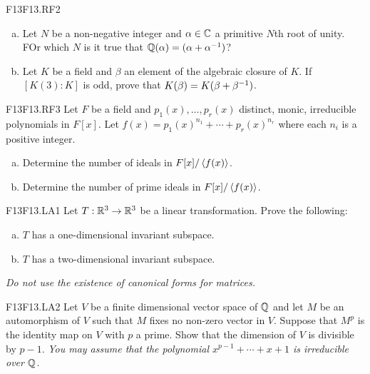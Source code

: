 \documentclass[../AlgebraQualSolutions.tex]{subfiles}
\begin{document}
\begin{prob}{F13}{F13.RF2}

	\begin{enumerate}[(a)]
		\item Let $N$ be a non-negative integer and $\alpha \in \mathbb{C}$ a primitive $N$th root of unity. FOr which $N$ is it true that $\mathbb{Q}(\alpha) = (\alpha + \alpha^{-1})$?
		\item Let $K$ be a field and $\beta$ an element of the algebraic closure of $K$. If $[K(3):K]$ is odd, prove that $K(\beta) = K(\beta + \beta^{-1})$.
	\end{enumerate}
\end{prob}

\begin{prob}{F13}{F13.RF3}
	Let $F$ be a field and $p_1(x), \ldots, p_r(x)$ distinct, monic, irreducible polynomials in $F[x]$. Let $f(x) = p_1(x)^{n_1} + \cdots + p_r(x)^{n_r}$ where each $n_i$ is a positive integer.

	\begin{enumerate}[(a)]
		\item Determine the number of ideals in $F[x]/\left\langle f(x) \right\rangle$.
		\item Determine the number of prime ideals in $F[x]/\left\langle f(x) \right\rangle$.
	\end{enumerate}
\end{prob}

\begin{prob}{F13}{F13.LA1}
	Let $T: \mathbb{R}^3 \to \mathbb{R}^3$ be a linear transformation. Prove the following:
	\begin{enumerate}[(a)]
		\item $T$ has a one-dimensional invariant subspace.
		\item $T$ has a two-dimensional invariant subspace.
	\end{enumerate}

	\emph{ Do not use the existence of canonical forms for matrices.}
\end{prob}

\begin{prob}{F13}{F13.LA2}
	Let $V$ be a finite dimensional vector space of $\mathbb{Q}$ and let $M$ be an automorphism of $V$ such that $M$ fixes no non-zero vector in $V$. Suppose that $M^p$ is the identity map on $V$ with $p$ a prime. Show that the dimension of $V$ is divisible by $p-1$. \emph{ You may assume that the polynomial $x^{p-1} + \cdots + x + 1$ is irreducible  over $\mathbb{Q}$.}
\end{prob}
\end{document}
